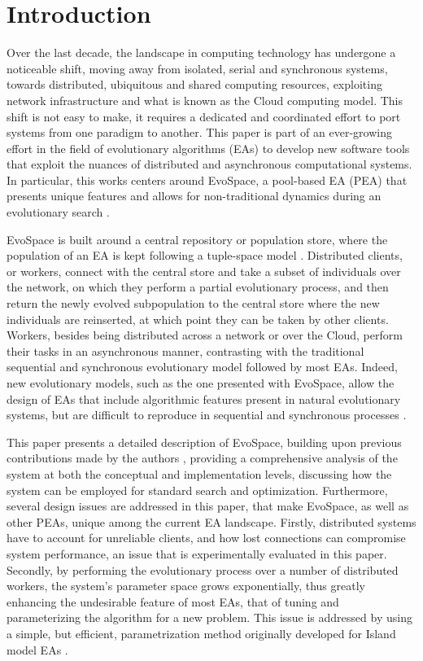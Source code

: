 \section{Introduction}
\label{sec:intro}
Over the last decade, the landscape in computing technology has undergone a noticeable shift, moving away from isolated,
serial and synchronous systems, towards distributed, ubiquitous and shared computing resources,
exploiting network infrastructure and what is known as the Cloud computing model\cite{cloud,varia2008}.
This shift is not easy to make, it requires a dedicated and coordinated effort to port systems from one paradigm to another.
This paper is part of an ever-growing effort in the field of evolutionary algorithms (EAs) to develop new software tools that exploit the nuances
of distributed and asynchronous computational systems.
In particular, this works centers around EvoSpace, a pool-based EA (PEA) that presents unique features and allows for non-traditional dynamics during
an evolutionary search \cite{Evospace}.

EvoSpace is built around a central repository or population store, where the population of an EA is kept following a tuple-space model \cite{linda}.
Distributed clients, or workers, connect with the central store and take a subset of individuals over the network, on which they perform a partial evolutionary
process, and then return the newly evolved subpopulation to the central store where the new individuals are reinserted, at which point they can be taken by other clients.
Workers, besides being distributed across a network or over the Cloud, perform their tasks in an asynchronous manner, contrasting with the traditional
sequential and synchronous evolutionary model followed by most EAs.
Indeed, new evolutionary models, such as the one presented with EvoSpace, allow the design of EAs that include algorithmic features present in natural evolutionary systems, but are difficult to reproduce in sequential and synchronous processes \cite{eiben}.

This paper presents a detailed description of EvoSpace, building upon previous contributions made by the authors \cite{Evospace,FreeLunch},
providing a comprehensive analysis of the system at both the conceptual and implementation levels, discussing how the system can be
employed for standard search and optimization.
Furthermore, several design issues are addressed in this paper, that make EvoSpace, as well as other PEAs, unique among the current EA landscape.
Firstly, distributed systems have to account for unreliable clients, and how lost connections can compromise system performance,
an issue that is experimentally evaluated in this paper.
Secondly, by performing the evolutionary process over a number of distributed workers, the system's parameter space grows exponentially,
thus greatly enhancing the undesirable feature of most EAs, that of tuning and parameterizing the algorithm for a new problem.
This issue is addressed by using a simple, but efficient, parametrization method originally developed for Island model EAs \cite{fuku2}.

